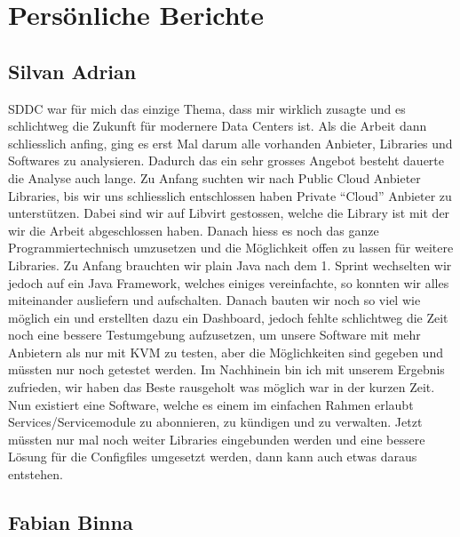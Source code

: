 \chapter{Persönliche Berichte}

\section{Silvan Adrian}

SDDC war für mich das einzige Thema, dass mir wirklich zusagte und es 
schlichtweg die Zukunft für modernere Data Centers ist.
Als die Arbeit dann schliesslich anfing, ging es erst Mal darum alle vorhanden 
Anbieter, Libraries und Softwares zu analysieren. Dadurch das ein sehr 
grosses Angebot besteht dauerte die Analyse auch lange.
Zu Anfang suchten wir nach Public Cloud Anbieter Libraries, bis 
wir uns schliesslich entschlossen haben Private ``Cloud'' Anbieter zu 
unterstützen. Dabei sind wir auf Libvirt gestossen, welche die 
Library ist mit der wir die Arbeit abgeschlossen haben.
Danach hiess es noch das ganze Programmiertechnisch umzusetzen und die 
Möglichkeit offen zu lassen für weitere Libraries.
Zu Anfang brauchten wir plain Java nach dem 1. Sprint wechselten wir jedoch auf ein 
Java Framework, welches einiges 
vereinfachte, so konnten wir alles miteinander ausliefern und aufschalten.
Danach bauten wir noch so viel wie möglich ein und erstellten dazu ein Dashboard,
 jedoch fehlte schlichtweg die 
Zeit noch eine bessere Testumgebung aufzusetzen, um unsere Software mit mehr 
Anbietern als nur mit KVM zu testen, aber die Möglichkeiten sind gegeben und 
müssten nur noch getestet werden.
\newline
Im Nachhinein bin ich mit unserem Ergebnis zufrieden, wir haben das Beste 
rausgeholt was möglich war in der kurzen Zeit.
Nun existiert eine Software, welche es einem im einfachen Rahmen erlaubt 
Services/Servicemodule zu abonnieren, zu kündigen und zu verwalten.
Jetzt müssten nur mal noch weiter Libraries eingebunden werden und eine bessere 
Lösung für die Configfiles umgesetzt werden, dann kann auch etwas daraus entstehen.

\newpage
\section{Fabian Binna}


